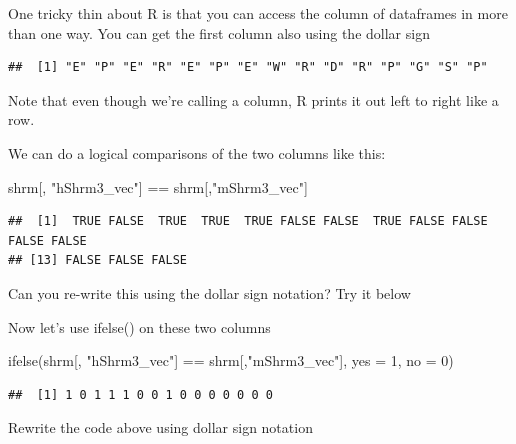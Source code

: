 \documentclass[
]{book}
\newenvironment{Shaded}{\begin{snugshade}}{\end{snugshade}}
\newcommand{\AttributeTok}[1]{\textcolor[rgb]{0.77,0.63,0.00}{#1}}
\newcommand{\DecValTok}[1]{\textcolor[rgb]{0.00,0.00,0.81}{#1}}
\newcommand{\FunctionTok}[1]{\textcolor[rgb]{0.00,0.00,0.00}{#1}}
\newcommand{\NormalTok}[1]{#1}
\newcommand{\SpecialCharTok}[1]{\textcolor[rgb]{0.00,0.00,0.00}{#1}}
\newcommand{\StringTok}[1]{\textcolor[rgb]{0.31,0.60,0.02}{#1}}
\begin{document}
One tricky thin about R is that you can access the column of dataframes in more than one way. You can get the first column also using the dollar sign

\begin{Shaded}
\end{Shaded}

\begin{verbatim}
##  [1] "E" "P" "E" "R" "E" "P" "E" "W" "R" "D" "R" "P" "G" "S" "P"
\end{verbatim}

Note that even though we're calling a column, R prints it out left to right like a row.

We can do a logical comparisons of the two columns like this:

\begin{Shaded}
\begin{Highlighting}[]
\NormalTok{shrm[, }\StringTok{"hShrm3\_vec"}\NormalTok{] }\SpecialCharTok{==}\NormalTok{ shrm[,}\StringTok{"mShrm3\_vec"}\NormalTok{]}
\end{Highlighting}
\end{Shaded}

\begin{verbatim}
##  [1]  TRUE FALSE  TRUE  TRUE  TRUE FALSE FALSE  TRUE FALSE FALSE FALSE FALSE
## [13] FALSE FALSE FALSE
\end{verbatim}

Can you re-write this using the dollar sign notation? Try it below

Now let's use ifelse() on these two columns

\begin{Shaded}
\begin{Highlighting}[]
\FunctionTok{ifelse}\NormalTok{(shrm[, }\StringTok{"hShrm3\_vec"}\NormalTok{] }\SpecialCharTok{==}\NormalTok{ shrm[,}\StringTok{"mShrm3\_vec"}\NormalTok{], }\AttributeTok{yes =} \DecValTok{1}\NormalTok{, }\AttributeTok{no =} \DecValTok{0}\NormalTok{)}
\end{Highlighting}
\end{Shaded}

\begin{verbatim}
##  [1] 1 0 1 1 1 0 0 1 0 0 0 0 0 0 0
\end{verbatim}

Rewrite the code above using dollar sign notation
\end{document}
